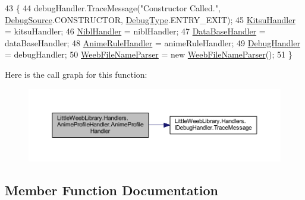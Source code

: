 \begin{DoxyCode}
43         \{
44             debugHandler.TraceMessage(\textcolor{stringliteral}{"Constructor Called."}, \mbox{\hyperlink{namespace_little_weeb_library_1_1_handlers_a2a6ca0775121c9c503d58aa254d292be}{DebugSource}}.CONSTRUCTOR, 
      \mbox{\hyperlink{namespace_little_weeb_library_1_1_handlers_ab66019ed40462876ec4e61bb3ccb0a62}{DebugType}}.ENTRY\_EXIT);
45             \mbox{\hyperlink{class_little_weeb_library_1_1_handlers_1_1_anime_profile_handler_adf3e37895c7834c51b436beed19d1aa5}{KitsuHandler}} = kitsuHandler;
46             \mbox{\hyperlink{class_little_weeb_library_1_1_handlers_1_1_anime_profile_handler_a4bba317e1a7ee70ecc0d7e108787d399}{NiblHandler}} = niblHandler;
47             \mbox{\hyperlink{class_little_weeb_library_1_1_handlers_1_1_anime_profile_handler_a4764b15d1f2aaf7d21aa461508a08a62}{DataBaseHandler}} = dataBaseHandler;
48             \mbox{\hyperlink{class_little_weeb_library_1_1_handlers_1_1_anime_profile_handler_aa8248a311fa69699a8230f005bcecdbc}{AnimeRuleHandler}} = animeRuleHandler;
49             \mbox{\hyperlink{class_little_weeb_library_1_1_handlers_1_1_anime_profile_handler_a0b0ae3c3838d26351485e6dfc566a632}{DebugHandler}} = debugHandler;
50             \mbox{\hyperlink{class_little_weeb_library_1_1_handlers_1_1_anime_profile_handler_a7f6515084315842dded98b57c4f7cd22}{WeebFileNameParser}} = \textcolor{keyword}{new} \mbox{\hyperlink{class_little_weeb_library_1_1_handlers_1_1_anime_profile_handler_a7f6515084315842dded98b57c4f7cd22}{WeebFileNameParser}}();
51         \}
\end{DoxyCode}
Here is the call graph for this function\+:\nopagebreak
\begin{figure}[H]
\begin{center}
\leavevmode
\includegraphics[width=350pt]{class_little_weeb_library_1_1_handlers_1_1_anime_profile_handler_ac2f5e6adc1c0a36ff24797a437bf490d_cgraph}
\end{center}
\end{figure}


\subsection{Member Function Documentation}
\mbox{\label{class_little_weeb_library_1_1_handlers_1_1_anime_profile_handler_aaa89fba506cfcdad18a5aa3f9b860061}} 

